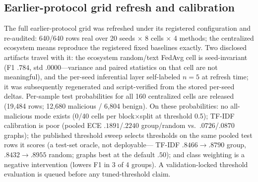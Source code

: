\documentclass[sigconf,nonacm]{acmart}
\begin{document}
\subsection{Earlier-protocol grid refresh and calibration}
The full earlier-protocol grid was refreshed under its registered
configuration and re-audited: 640/640 rows real over 20 seeds $\times$ 8
cells $\times$ 4 methods; the centralized ecosystem means reproduce the
registered fixed baselines exactly. Two disclosed artifacts travel with
it: the ecosystem random/text FedAvg cell is seed-invariant (F1 $.784$,
std $.0000$---variance and paired statistics on that cell are not
meaningful), and the per-seed inferential layer self-labeled $n{=}5$ at
refresh time; it was subsequently regenerated and script-verified from
the stored per-seed deltas. Per-sample test probabilities for all 160
centralized cells are released (19{,}484 rows; 12{,}680 malicious /
6{,}804 benign). On these probabilities: no all-malicious mode exists
(0/40 cells per block$\times$split at threshold 0.5); TF-IDF calibration
is poor (pooled ECE $.1891$/$.2240$ group/random vs.\ $.0726$/$.0870$
graphs); the published threshold sweep selects thresholds on the same
pooled test rows it scores (a test-set oracle, not deployable---
TF-IDF $.8466\to.8790$ group, $.8432\to.8955$ random; graphs best at the
default $.50$); and class weighting is a negative intervention (lowers
F1 in 3 of 4 groups). A validation-locked threshold evaluation is queued
before any tuned-threshold claim.
\end{document}
